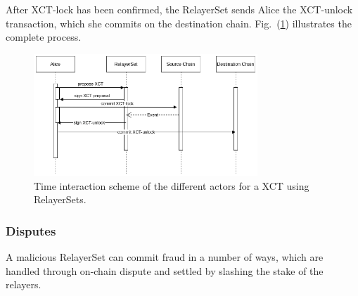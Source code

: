 After XCT-lock has been confirmed, the RelayerSet sends Alice the XCT-unlock transaction, which she commits on the destination chain. Fig.~(\ref{fig:v3_protocol}) illustrates the complete process.

\begin{figure}[h]
    \centering
    \includegraphics[width=0.75\textwidth]{images/mosaic/phase3/protocol.png}
    \caption{Time interaction scheme of the different actors for a XCT using RelayerSets. }
    \label{fig:v3_protocol}
\end{figure}

\subsubsection*{Disputes}
A malicious RelayerSet can commit fraud in a number of ways, which are handled through on-chain dispute and settled by slashing the stake of the relayers.

